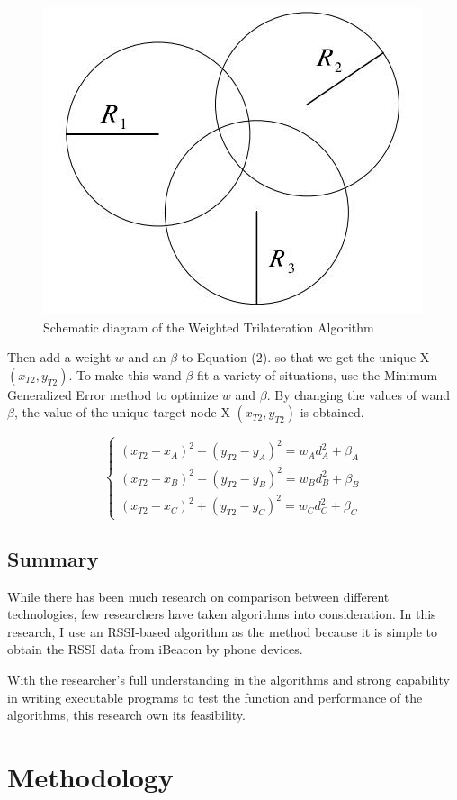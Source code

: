 \documentclass{sigchi}
\begin{document}
\begin{figure}[!h]
\centering
\includegraphics[width=0.6\columnwidth]{2}
\caption{Schematic diagram of the Weighted Trilateration Algorithm}
\label{fig:universe}
\end{figure}

Then add a weight $w$ and an $\beta$ to Equation (2). so that we get the unique X $(x_{T2}, y_{T2})$. To make this wand $\beta$ fit a variety of situations, use the Minimum Generalized Error method to optimize $w$ and $\beta$. By changing the values of wand $\beta$, the value of the unique target node X $(x_{T2}, y_{T2})$ is obtained.

\begin{equation*} \begin{cases} (x_{T2}-x_{A})^{2}+(y_{T2}-y_{A})^{2}=w_{A}d_{A}^{2}+\beta_{A}\\ (x_{T2}-x_{B})^{2}+(y_{T2}-y_{B})^{2}=w_{B}d_{B}^{2}+\beta_{B}\\ (x_{T2}-x_{C})^{2}+(y_{T2}-y_{C})^{2}=w_{C}d_{C}^{2}+\beta_{C} \end{cases} \tag{4} \end{equation*}

\subsection{Summary}
While there has been much research on comparison between different technologies, few researchers have taken algorithms into consideration. 
In this research, I use an RSSI-based algorithm as the method because it is simple to obtain the RSSI data from iBeacon by phone devices.

With the researcher's full understanding in the algorithms and strong capability in writing executable programs to test the function and performance of the algorithms, this research own its feasibility.

 
\section{Methodology}
\end{document}

